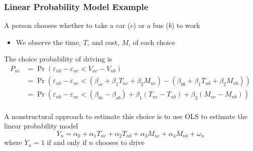 \documentclass{beamer}\usepackage[]{graphicx}\usepackage[]{xcolor}
\begin{document}
\begin{frame}\frametitle{Linear Probability Model Example}
    A person chooses whether to take a car ($c$) or a bus ($b$) to work
    \begin{itemize}
    	\item We observe the time, $T$, and cost, $M$, of each choice
    \end{itemize}
    \vspace{2ex}
    The choice probability of driving is
    \begin{align*}
    	P_{nc} & = \Pr(\varepsilon_{nb} - \varepsilon_{nc} < V_{nc} - V_{nb}) \\
    	& = \Pr(\varepsilon_{nb} - \varepsilon_{nc} < (\beta_{oc} + \beta_1 T_{nc} + \beta_2 M_{nc}) - (\beta_{0b} + \beta_1 T_{nb} + \beta_2 M_{nb})) \\
    	& = \Pr(\varepsilon_{nb} - \varepsilon_{nc} < (\beta_{0c} - \beta_{ob}) + \beta_1(T_{nc} - T_{nb}) + \beta_2(M_{nc} - M_{nb}))
    \end{align*} \\
    \vspace{2ex}
    A nonstructural approach to estimate this choice is to use OLS to estimate the linear probability model
    $$Y_n = \alpha_0 + \alpha_1 T_{nc} + \alpha_2 T_{nb} + \alpha_3 M_{nc} + \alpha_4 M_{nb} + \omega_n$$
    where $Y_n = 1$ if and only if $n$ chooses to drive
\end{frame}
\end{document}
